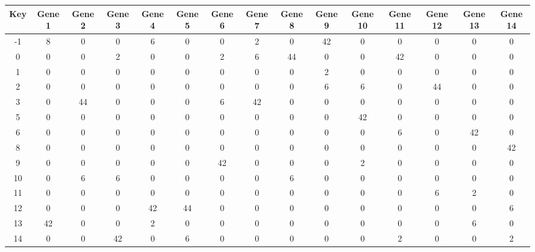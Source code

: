 \begin{tabular}{|c|c|c|c|c|c|c|c|c|c|c|c|c|c|c|}
\hline
Key & Gene 1 & Gene 2 & Gene 3 & Gene 4 & Gene 5 & Gene 6 & Gene 7 & Gene 8 & Gene 9 & Gene 10 & Gene 11 & Gene 12 & Gene 13 & Gene 14 \\
\hline
-1 & 8 & 0 & 0 & 6 & 0 & 0 & 2 & 0 & 42 & 0 & 0 & 0 & 0 & 0 \\
0 & 0 & 0 & 2 & 0 & 0 & 2 & 6 & 44 & 0 & 0 & 42 & 0 & 0 & 0 \\
1 & 0 & 0 & 0 & 0 & 0 & 0 & 0 & 0 & 2 & 0 & 0 & 0 & 0 & 0 \\
2 & 0 & 0 & 0 & 0 & 0 & 0 & 0 & 0 & 6 & 6 & 0 & 44 & 0 & 0 \\
3 & 0 & 44 & 0 & 0 & 0 & 6 & 42 & 0 & 0 & 0 & 0 & 0 & 0 & 0 \\
5 & 0 & 0 & 0 & 0 & 0 & 0 & 0 & 0 & 0 & 42 & 0 & 0 & 0 & 0 \\
6 & 0 & 0 & 0 & 0 & 0 & 0 & 0 & 0 & 0 & 0 & 6 & 0 & 42 & 0 \\
8 & 0 & 0 & 0 & 0 & 0 & 0 & 0 & 0 & 0 & 0 & 0 & 0 & 0 & 42 \\
9 & 0 & 0 & 0 & 0 & 0 & 42 & 0 & 0 & 0 & 2 & 0 & 0 & 0 & 0 \\
10 & 0 & 6 & 6 & 0 & 0 & 0 & 0 & 6 & 0 & 0 & 0 & 0 & 0 & 0 \\
11 & 0 & 0 & 0 & 0 & 0 & 0 & 0 & 0 & 0 & 0 & 0 & 6 & 2 & 0 \\
12 & 0 & 0 & 0 & 42 & 44 & 0 & 0 & 0 & 0 & 0 & 0 & 0 & 0 & 6 \\
13 & 42 & 0 & 0 & 2 & 0 & 0 & 0 & 0 & 0 & 0 & 0 & 0 & 6 & 0 \\
14 & 0 & 0 & 42 & 0 & 6 & 0 & 0 & 0 & 0 & 0 & 2 & 0 & 0 & 2 \\
\hline
\end{tabular}